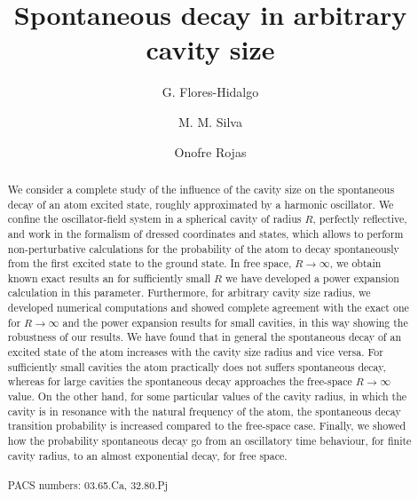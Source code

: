 \documentclass[10pt,english,twocolumn]{revtex4}
\begin{document}
\title{Spontaneous decay in arbitrary cavity size}

\author{G. Flores-Hidalgo}

\author{M. M. Silva}
  
\author{Onofre Rojas} 


\begin{abstract}
We consider a complete study of the influence of the cavity size on the spontaneous decay of an atom excited state, roughly  
approximated by a harmonic oscillator. We confine the oscillator-field system in a spherical cavity of radius $R$, perfectly reflective, and work in the formalism of dressed coordinates and states, which allows  to perform non-perturbative calculations for the
probability of the atom to decay spontaneously from the
first excited state to the ground state.
In free space, $R\to\infty$, we obtain known exact results an
for sufficiently small $R$ we have developed a power expansion calculation in this parameter.  Furthermore, for arbitrary cavity size radius, we developed  numerical computations and showed complete agreement with the exact one for $R\to\infty$ and the power expansion results for small cavities,
in this way showing the robustness of our results. We have found that in general the spontaneous decay of an excited state of the atom
increases with the cavity size radius and vice versa. For sufficiently small cavities  the atom practically does not suffers spontaneous decay, 
whereas for large cavities the spontaneous decay approaches the free-space $R\to\infty$ value. On the other hand, for some particular values of the cavity radius, in which the cavity is in resonance with the natural frequency of the atom, the spontaneous decay transition probability  is increased compared to the
free-space case.  Finally, we showed how the probability spontaneous decay  go from an oscillatory time behaviour, for finite cavity radius, to an
almost exponential decay, for free space. 
\\
\\
 PACS numbers: 03.65.Ca, 32.80.Pj
\end{abstract}
\end{document}
